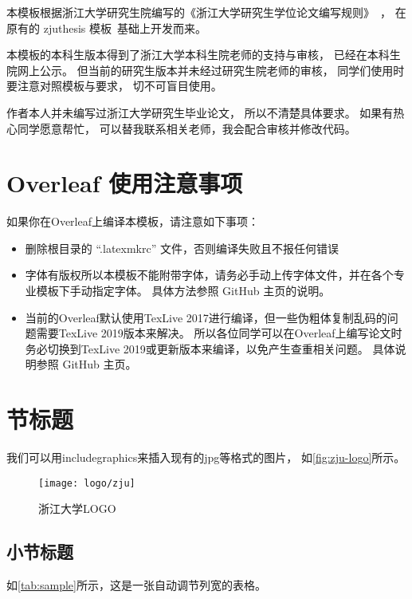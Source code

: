 本模板根据浙江大学研究生院编写的《浙江大学研究生学位论文编写规则》~\cite{zjugradthesisrules}，
在原有的 zjuthesis 模板~\cite{zjuthesis}基础上开发而来。

本模板的本科生版本\cite{zjuthesisrules}得到了浙江大学本科生院老师的支持与审核，
已经在本科生院网上公示。
但当前的研究生版本并未经过研究生院老师的审核，
同学们使用时要注意对照模板与要求，
切不可盲目使用。

作者本人并未编写过浙江大学研究生毕业论文，
所以不清楚具体要求。
如果有热心同学愿意帮忙，
可以替我联系相关老师，我会配合审核并修改代码。

\section{Overleaf 使用注意事项}

如果你在Overleaf上编译本模板，请注意如下事项：

\begin{itemize}
    \item 删除根目录的 ``.latexmkrc'' 文件，否则编译失败且不报任何错误
    \item 字体有版权所以本模板不能附带字体，请务必手动上传字体文件，并在各个专业模板下手动指定字体。
          具体方法参照 GitHub 主页的说明。
    \item 当前的Overleaf默认使用TexLive 2017进行编译，但一些伪粗体复制乱码的问题需要TexLive 2019版本来解决。
          所以各位同学可以在Overleaf上编写论文时务必切换到TexLive 2019或更新版本来编译，以免产生查重相关问题。
          具体说明参照 GitHub 主页。
\end{itemize}


\section{节标题}

我们可以用includegraphics来插入现有的jpg等格式的图片，
如\autoref{fig:zju-logo}所示。

\begin{figure}[htbp]
    \centering
    \texttt{[image: logo/zju]}
    \caption{\label{fig:zju-logo}浙江大学LOGO}
\end{figure}


\subsection{小节标题}


\par 如\autoref{tab:sample}所示，这是一张自动调节列宽的表格。

